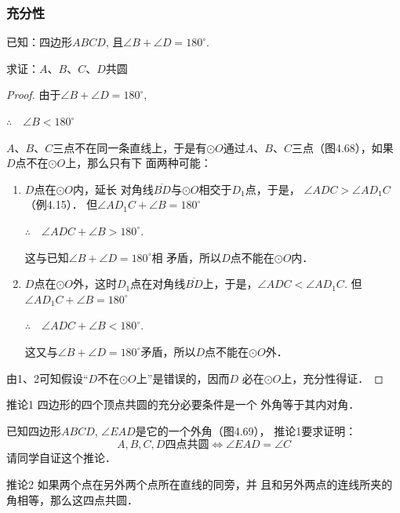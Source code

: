 \subsubsection{充分性}
已知：四边形$ABCD$, 且$\angle B+\angle D=180^{\circ}$.

求证：$A$、$B$、$C$、$D$共圆

\begin{proof}
  由于$\angle B+\angle D=180^{\circ}$,

$\therefore\quad \angle B <180^{\circ}$

$A$、$B$、$C$三点不在同一条直线上，于是有$\odot O$通过$A$、$B$、$C$三点（图4.68），如果$D$点不在$\odot O$上，那么只有下
面两种可能：
\begin{enumerate}
  \item $D$点在$\odot O$内，延长
  对角线$\overline{BD}$与$\odot O$相交于$D_1$点，于是，
  $\angle ADC>\angle AD_1C$（例4.15）．
  但$\angle AD_1C+\angle B=180^{\circ}$
 
$\therefore\quad \angle ADC+\angle B>180^{\circ}$. 

这与已知$\angle B+\angle D=180^{\circ}$相
  矛盾，所以$D$点不能在$\odot O$内．
\item $D$点在$\odot O$外，这时$D_1$点在对角线$\overline{BD}$上，于是，$\angle ADC<\angle AD_1C$. 
  但$\angle AD_1C+\angle B=180^{\circ}$

$\therefore\quad \angle ADC+\angle B<180^{\circ}$.

  这又与$\angle B+\angle D=180^{\circ}$矛盾，所以$D$点不能在$\odot O$外．
\end{enumerate}

由1、2可知假设“$D$不在$\odot O$上”是错误的，因而$D$
  必在$\odot O$上，充分性得证．
\end{proof}

\begin{blk}
  {推论1} 四边形的四个顶点共圆的充分必要条件是一个
外角等于其内对角．
\end{blk}

已知四边形$ABCD$, $\angle EAD$是它的一个外角（图4.69），
推论1要求证明：
\[A,B,C,D\text{四点共圆}\Longleftrightarrow\angle EAD=\angle C\]
请同学自证这个推论．

\begin{blk}
  {推论2} 如果两个点在另外两个点所在直线的同旁，并
且和另外两点的连线所夹的角相等，那么这四点共圆．
\end{blk}

